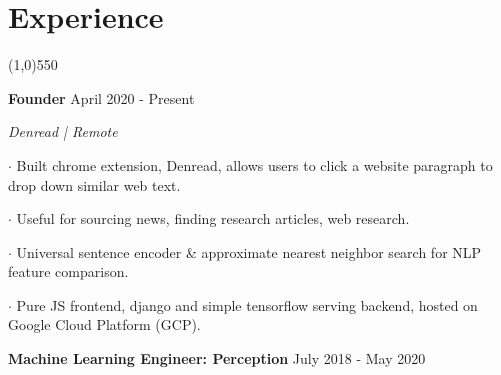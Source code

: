 \documentclass[11pt]{article} %
\begin{document}
	\section*{Experience}
	\vspace{-7ex}
	\begin{center}
    \line(1,0){550}
    \end{center}
    \vspace{+0ex}
    \textbf{\large Founder} \hfill April 2020 - Present
    \setlength{\parindent}{-0ex} \par
    \textit{Denread | Remote} \vspace{+3ex} \par
    $\boldsymbol{\cdot}$ Built chrome extension, Denread, allows users to click a website paragraph to drop down similar web text. \par \vspace{+1ex}
    $\boldsymbol{\cdot}$ Useful for sourcing news, finding research articles, web research. \par \vspace{+1ex}
    $\boldsymbol{\cdot}$ Universal sentence encoder \& approximate nearest neighbor search for NLP feature comparison.\par \vspace{+1ex}
    $\boldsymbol{\cdot}$ Pure JS frontend, django and simple tensorflow serving backend, hosted on Google Cloud Platform (GCP). \par 
    \vspace{+4ex}
    \textbf{\large Machine Learning Engineer: Perception} \hfill July 2018 - May 2020 \vspace{-0ex}
\end{document}

